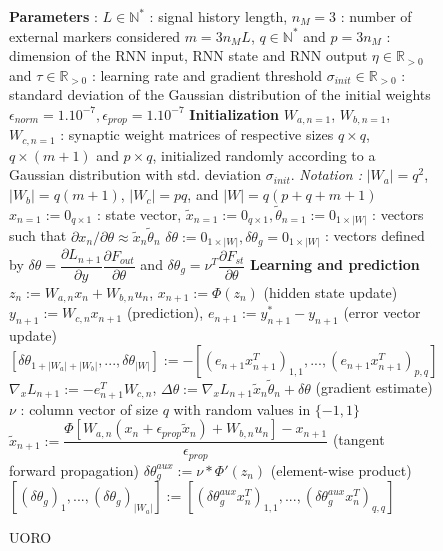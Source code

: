 \documentclass[twocolumn,a4paper]{svjour3} \sloppy          \smartqed
\begin{document}
\begin{figure*}[hbt!]
\centering
\begin{minipage}{.8\textwidth}
\begin{algorithm}[H]
\small
\caption{UORO}
\label{alg:RNN-UORO}
\begin{algorithmic}[1]
\State \textbf{Parameters} :
\State $L \in \mathbb{N}^* $ : signal history length, $n_M = 3 $ : number of external markers considered
\State $m = 3 n_M L$, $q \in \mathbb{N}^*$ and $p = 3 n_M$ : dimension of the RNN input, RNN state and RNN output
\State $\eta \in \mathbb{R}_{>0} $ and $\tau \in \mathbb{R}_{>0 }$ : learning rate and gradient threshold
\State $\sigma_{init} \in \mathbb{R}_{>0} $ : standard deviation of the Gaussian distribution of the initial weights
\State $\epsilon_{norm} = 1.10^{-7}, \epsilon_{prop} = 1.10^{-7} $
\State
\State \textbf{Initialization}
\State $W_{a,n=1}$, $W_{b,n=1}$, $W_{c,n=1}$ : synaptic weight matrices of respective sizes $q \times q$, $q \times (m+1)$ and $p \times q$, initialized randomly according to a Gaussian distribution with std. deviation $\sigma_{init}$. 
\State \textit{Notation :} $|W_{a}| = q^2$, $|W_{b}| = q(m+1)$, $|W_{c}| = p q$, and $|W| = q(p+q+m+1)$
\State $x_{n=1} := 0_{q \times 1}$ : state vector, $\tilde{x}_{n=1} := 0_{q \times 1}, \tilde{\theta}_{n=1} := 0_{1 \times |W|}$ : vectors such that $\partial{x_n}/\partial{\theta} \approx \tilde{x}_n \tilde{\theta}_n$
\State $\delta\theta := 0_{1 \times |W|}, \delta\theta_g = 0_{1 \times |W|}$ : vectors defined by 
$\delta\theta = \dfrac{\partial L_{n+1}}{\partial y}\dfrac{\partial F_{out}}{\partial \theta}$ and 
$\delta\theta_g = \nu^T \dfrac{\partial F_{st}}{\partial \theta}$
\State
\State \textbf{Learning and prediction}
\State $z_n := W_{a,n}x_n + W_{b,n}u_n$, $x_{n+1} := \Phi(z_n)$ (hidden state update)
\State $y_{n+1} := W_{c,n}x_{n+1}$ (prediction), $e_{n+1} := y^*_{n+1} - y_{n+1}$ (error vector update)
\State $[\delta\theta_{1+|W_{a}|+|W_{b}|}, ..., \delta\theta_{|W|}] := -[{(e_{n+1} x_{n+1}^T)}_{1,1}, ..., (e_{n+1} x_{n+1}^T)_{p,q}]$
\State $\nabla_x L_{n+1} := - e_{n+1}^T W_{c,n}$, $\Delta\theta := \nabla_x L_{n+1} \tilde{x}_n \tilde{\theta}_n + \delta{\theta}$ (gradient estimate)
\State $\nu$ : column vector of size $q$ with random values in $\{-1, 1\}$
\State $\tilde{x}_{n+1} := \dfrac{\Phi[W_{a,n}(x_n+\epsilon_{prop}\tilde{x}_n) + W_{b,n}u_n]-x_{n+1}}{\epsilon_{prop}}$ (tangent forward propagation)
\State $\delta\theta_g^{aux} := \nu * \Phi'(z_n)$ (element-wise product) \State $[(\delta\theta_g)_1, ..., (\delta\theta_g)_{|W_{a}|}] := [{(\delta\theta_g^{aux} x_n^T)}_{1,1}, ..., {(\delta\theta_g^{aux} x_n^T)}_{q,q}]$

\end{algorithmic}
\end{algorithm}
\end{minipage}
\end{figure*}
\end{document}
